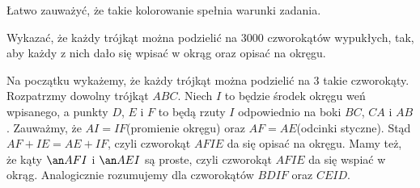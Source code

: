 \begin{center}
\begin{tikzpicture}[x=1cm, scale=0.4]
    \end{tikzpicture}
    \hspace{30px}
\end{center}

\noindent
Łatwo zauważyć, że takie kolorowanie spełnia warunki zadania.

\begin{problem}{3}
	Wykazać, że każdy trójkąt można podzielić na $3000$ czworokątów wypukłych, tak, aby każdy z nich dało się wpisać w okrąg oraz opisać na okręgu.
\end{problem}

\noindent
Na początku wykażemy, że każdy trójkąt można podzielić na $3$ takie czworokąty. Rozpatrzmy dowolny trójkąt $ABC$. Niech $I$ to będzie środek okręgu weń wpisanego, a punkty $D$, $E$ i $F$ to będą rzuty $I$ odpowiednio na boki $BC$, $CA$ i $AB$. Zauważmy, że $AI = IF$(promienie okręgu) oraz $AF = AE$(odcinki styczne). Stąd $AF + IE = AE + IF$, czyli czworokąt $AFIE$ da się opisać na okręgu. Mamy też, że kąty $\an AFI$ i $\an AEI$ są proste, czyli czworokąt $AFIE$ da się wspiać w okrąg. Analogicznie rozumujemy dla czworokątów $BDIF$ oraz $CEID$.

